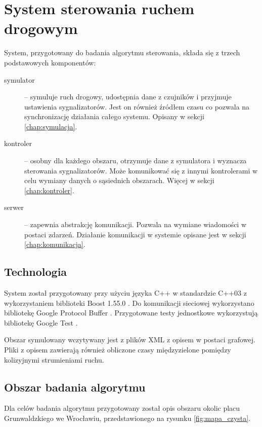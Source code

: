\chapter{System sterowania ruchem drogowym}
System, przygotowany do badania algorytmu sterowania, składa się z trzech podstawowych komponentów:
\begin{description}
	\item[symulator] --
		symuluje ruch drogowy, udostępnia dane z czujników i przyjmuje ustawienia sygnalizatorów.
		Jest on również źródłem czasu co pozwala na synchronizację działania całego systemu. Opisany w sekcji \ref{chap:symulacja}.
	\item[kontroler] --
		osobny dla każdego obszaru, otrzymuje dane z symulatora i wyznacza sterowania sygnalizatorów.
		Może komunikować się z innymi kontrolerami w celu wymiany danych o sąsiednich obszarach. Więcej w sekcji \ref{chap:kontroler}.
	\item[serwer] --
		zapewnia abstrakcję komunikacji. Pozwala na wymiane wiadomości w postaci zdarzeń.
		Działanie komunikacji w systemie opisane jest w sekcji \ref{chap:komunikacja}.
\end{description}

\section{Technologia}
System został przygotowany przy użyciu języka C++ w standardzie C++03 z wykorzystaniem biblioteki Boost 1.55.0 \cite{boost}. Do komunikacji sieciowej wykorzystano bibliotekę Google Protocol Buffer \cite{protobuf}. Przygotowane testy jednostkowe wykorzystują bibliotekę Google Test \cite{gtest}.

Obszar symulowany wczytywany jest z plików XML z opisem w postaci grafowej. Pliki z opisem zawierają również obliczone czasy międzyzielone pomiędzy kolizyjnymi strumieniami ruchu.

\section{Obszar badania algorytmu}
Dla celów badania algorytmu przygotowany został opis obszaru okolic placu Grunwaldzkiego we Wrocławiu, przedstawionego na rysunku \ref{fig:mapa_czysta}.

